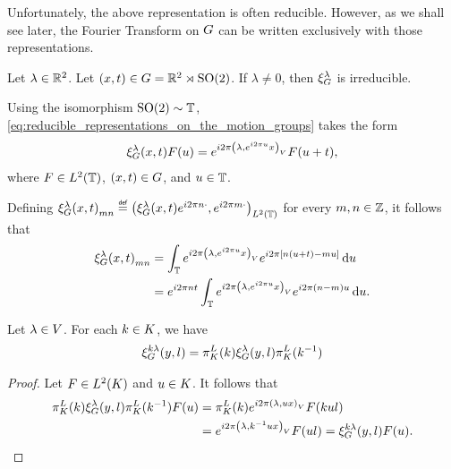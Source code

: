 Unfortunately, the above representation is often reducible.
However, as we shall see later, the Fourier Transform on $G$ can be written exclusively with those representations.

\begin{example}
    Let $\lambda \in \mathbb{R}^2$.
    Let $(x, t) \in G = \mathbb{R}^2 \rtimes {\mathrm{SO} (2)}$.
    If $\lambda \neq 0$, then $\xi^{\lambda}_{G}$ is irreducible.

    Using the isomorphism ${\mathrm{SO} (2)} \sim \mathbb{T}$,
    \eqref{eq:reducible_representations_on_the_motion_groups} takes the form
    \begin{align*}
        \xi^{\lambda}_{G}(x, t) F(u)
        = e^{i 2 \pi {\left(\lambda, e^{i2 \pi u} x\right)_{V}}} F(u + t),
    \end{align*}
    where $F \in {L^{2} (\mathbb{T})}$, $(x, t) \in G$, and $u \in \mathbb{T}$.

    Defining ${\Rep\lambda(x, t)}_{m n} \defeq \ip[\Lebesgue{2}\T]{\Rep\lambda(x, t) \e^{\i \turn n \dummy}}{\e^{\i \turn m \dummy}}$ for every $m, n \in \mathbb{Z}$,
    it follows that
    \begin{align*}
        {\xi^{\lambda}_{G}(x, t)}_{m n}
        &= \int_{\mathbb{T}} e^{i 2 \pi {\left(\lambda, e^{i2 \pi u} x\right)_{V}}} e^{i 2 \pi [n (u + t) - m u]} \,\mathrm{d} u\\
        &= e^{i 2 \pi n t} \int_{\mathbb{T}} e^{i 2 \pi {\left(\lambda, e^{i2 \pi u} x\right)_{V}}} e^{i 2 \pi (n - m)u} \,\mathrm{d} u.
    \end{align*}
\end{example}

\begin{lemma}
    Let $\lambda \in V$.
    For each $k \in K$, we have
    \begin{align*}
        \xi^{k \lambda}_{G}(y, l) = \pi^L_{K}(k) \xi^{\lambda}_{G}(y, l) \pi^L_{K}(k^{-1})
    \end{align*}
\end{lemma}
\begin{proof}
    Let $F \in {L^{2} (K)}$ and $u \in K$.
    It follows that
    \begin{align*}
        \pi^L_{K}(k) \xi^{\lambda}_{G}(y, l) \pi^L_{K}(k^{-1}) F(u)
        &= \pi^L_{K}(k) e^{i 2 \pi {\left(\lambda, u x\right)_{V}}} F(k u l)\\
        &= e^{i 2 \pi {\left(\lambda, k^{-1} u x\right)_{V}}} F(u l)
        = \xi^{k \lambda}_{G}(y, l) F(u).
    \end{align*}
\end{proof}

